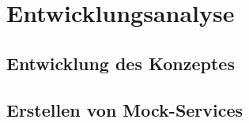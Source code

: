 \chapter{Entwicklungsanalyse}
\section{Entwicklung des Konzeptes}
\section{Erstellen von Mock-Services}